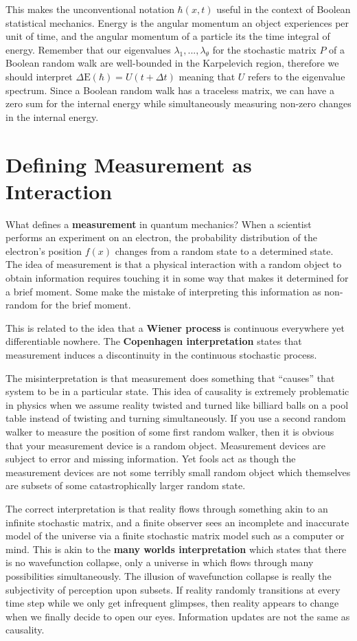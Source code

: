 \documentclass[10pt, a5paper, twoside, openright]{memoir}
\begin{document}
This makes the unconventional notation $\hbar (x, t)$ useful in the context of Boolean statistical mechanics. Energy is the angular momentum an object experiences per unit of time, and the angular momentum of a particle its the time integral of energy. Remember that our eigenvalues $\lambda_1,...,\lambda_\theta$ for the stochastic matrix $P$ of a Boolean random walk are well-bounded in the Karpelevich region, therefore we should interpret $\Delta \mathrm{E}(\hbar) = U (t + \Delta t)$ meaning that $U$ refers to the eigenvalue spectrum. Since a Boolean random walk has a traceless matrix, we can have a zero sum for the internal energy while simultaneously measuring non-zero changes in the internal energy.

\section{Defining Measurement as Interaction}
What defines a \textbf{measurement} in quantum mechanics? When a scientist performs an experiment on an electron, the probability distribution of the electron's position $f(x)$ changes from a random state to a determined state. The idea of measurement is that a physical interaction with a random object to obtain information requires touching it in some way that makes it determined for a brief moment. Some make the mistake of interpreting this information as non-random for the brief moment.

This is related to the idea that a \textbf{Wiener process} is continuous everywhere yet differentiable nowhere. The \textbf{Copenhagen interpretation} states that measurement induces a discontinuity in the continuous stochastic process.

The misinterpretation is that measurement does something that ``causes'' that system to be in a particular state. This idea of causality is extremely problematic in physics when we assume reality twisted and turned like billiard balls on a pool table instead of twisting and turning simultaneously. If you use a second random walker to measure the position of some first random walker, then it is obvious that your measurement device is a random object. Measurement devices are subject to error and missing information. Yet fools act as though the measurement devices are not some terribly small random object which themselves are subsets of some catastrophically larger random state.

The correct interpretation is that reality flows through something akin to an infinite stochastic matrix, and a finite observer sees an incomplete and inaccurate model of the universe via a finite stochastic matrix model such as a computer or mind. This is akin to the \textbf{many worlds interpretation} which states that there is no wavefunction collapse, only a universe in which flows through many possibilities simultaneously. The illusion of wavefunction collapse is really the subjectivity of perception upon subsets. If reality randomly transitions at every time step while we only get infrequent glimpses, then reality appears to change when we finally decide to open our eyes. Information updates are not the same as causality.
\end{document}
